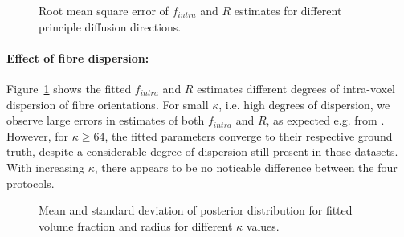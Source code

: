 \begin{figure}[!h]
   {
\centering
    
    
    
  }
	\caption{Root mean square error of $f_{intra}$ and $R$ estimates for different principle diffusion directions.}
	\label{fig:chapter7 exp1 angular vals 60mT}
\end{figure}


\paragraph{Effect of fibre dispersion: } Figure~\ref{fig:chapter7 exp1 angular vals 60mT} shows the fitted $f_{intra}$ and $R$ estimates different degrees of intra-voxel dispersion of fibre orientations. For small $\kappa$, i.e. high degrees of dispersion, we observe large errors in estimates of both $f_{intra}$ and $R$, as expected e.g. from \citep{Zhang:2011}. However, for $\kappa \ge 64$, the fitted parameters converge to their respective ground truth, despite a considerable degree of dispersion still present in those datasets. With increasing $\kappa$, there appears to be no noticable difference between the four protocols.

\begin{figure}[h!]
	\centering
	
	
	\caption{Mean and standard deviation of posterior distribution for fitted volume fraction and radius for different $\kappa$ values.}
	\label{fig:chapter7 exp1 boxplots 60mT}
\end{figure}


